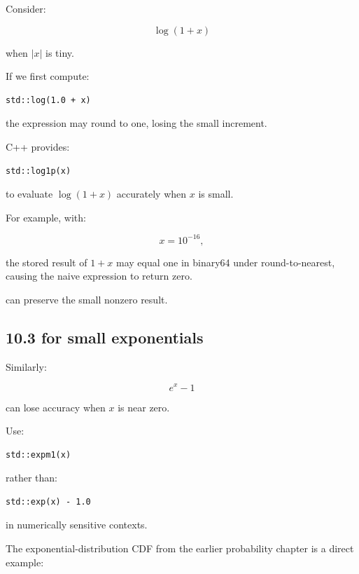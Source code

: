 Consider:

\[ \log(1+x) \]

when \(|x|\) is tiny.

If we first compute:

\begin{verbatim}
std::log(1.0 + x)
\end{verbatim}

the expression  may round to one, losing the small increment.

C++ provides:

\begin{verbatim}
std::log1p(x)
\end{verbatim}

to evaluate \(\log(1+x)\) accurately when \(x\) is small.

For example, with:

\[ x=10^{-16}, \]

the stored result of \(1+x\) may equal one in binary64 under round-to-nearest, causing the naive expression to return zero.

 can preserve the small nonzero result.

\subsection{\texorpdfstring{10.3  for small exponentials}{10.3  for small exponentials}}\label{02-foundations-ii-ch028-expm1-for-small-exponentials}

\hypertarget{02-foundations-ii-ch028-expm1-for-small-exponentials}{}

Similarly:

\[ e^x-1 \]

can lose accuracy when \(x\) is near zero.

Use:

\begin{verbatim}
std::expm1(x)
\end{verbatim}

rather than:

\begin{verbatim}
std::exp(x) - 1.0
\end{verbatim}

in numerically sensitive contexts.

The exponential-distribution CDF from the earlier probability chapter is a direct example:

